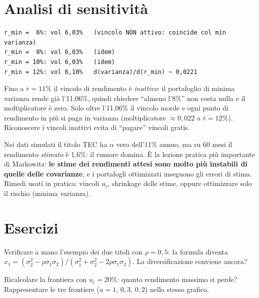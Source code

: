 \section{Analisi di sensitività}

\begin{lstlisting}[style=output]
r_min =  6%: vol 6,03%   (vincolo NON attivo: coincide col min varianza)
r_min =  8%: vol 6,03%   (idem)
r_min = 10%: vol 6,03%   (idem)
r_min = 12%: vol 6,10%   d(varianza)/d(r_min) ~ 0,0221
\end{lstlisting}

\begin{spiegazione}
Fino a $\bar r = 11\%$ il vincolo di rendimento è \emph{inattivo}: il portafoglio di
minima varianza rende già l'11,06\%, quindi chiedere ``almeno l'8\%'' non costa nulla
e il moltiplicatore è zero. Solo oltre l'11,06\% il vincolo morde e ogni punto di
rendimento in più si paga in varianza (moltiplicatore $\approx 0{,}022$ a
$\bar r = 12\%$). Riconoscere i vincoli inattivi evita di ``pagare'' vincoli gratis.
\end{spiegazione}

\begin{attenzione}
Nei dati simulati il titolo TEC ha $\alpha$ vero dell'11\% annuo, ma su 60 mesi il
rendimento \emph{stimato} è 1,6\%: il rumore domina. È la lezione pratica più
importante di Markowitz: \textbf{le stime dei rendimenti attesi sono molto più
instabili di quelle delle covarianze}, e i portafogli ottimizzati inseguono gli errori
di stima. Rimedi usati in pratica: vincoli $u_i$, shrinkage delle stime, oppure
ottimizzare solo il rischio (minima varianza).
\end{attenzione}

\section{Esercizi}

\begin{esercizio}[verifica]
Verificare a mano l'esempio dei due titoli con $\rho = 0{,}5$: la formula diventa
$x_1 = (\sigma_2^2 - \rho\sigma_1\sigma_2)/(\sigma_1^2 + \sigma_2^2
- 2\rho\sigma_1\sigma_2)$. La diversificazione conviene ancora?
\end{esercizio}

\begin{esercizio}[frontiera]
Ricalcolare la frontiera con $u_i = 20\%$: quanto rendimento massimo si perde?
Rappresentare le tre frontiere ($u = 1$, $0{,}3$, $0{,}2$) nello stesso grafico.
\end{esercizio}


